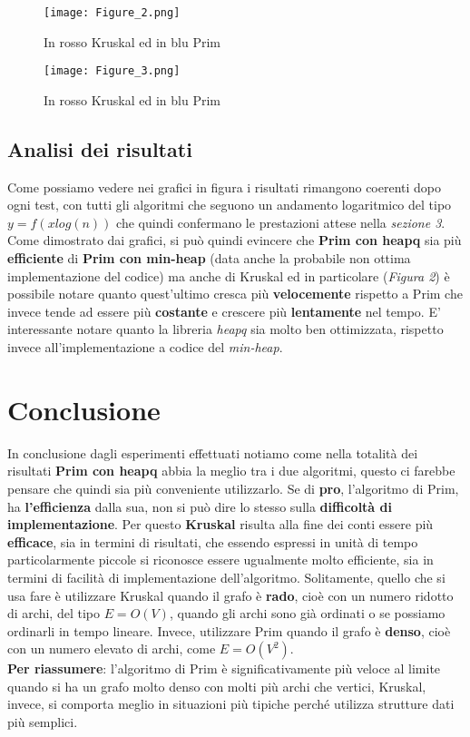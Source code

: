 \documentclass{article}
\begin{document}
\begin{figure}[!hb]
        \centering
        \texttt{[image: Figure\_2.png]}
        \caption{In rosso Kruskal ed in blu Prim}
        \label{fig:KruskalvsPrim}
\end{figure}

\begin{figure}[!hb]
        \centering
        \texttt{[image: Figure\_3.png]}
        \caption{In rosso Kruskal ed in blu Prim}
        \label{fig:KruskalvsPrim}
\end{figure}

\clearpage

\subsection{Analisi dei risultati}
Come possiamo vedere nei grafici in figura i risultati rimangono coerenti dopo ogni test, con tutti gli algoritmi che seguono un andamento logaritmico del tipo $y=f(xlog(n))$ che quindi confermano le prestazioni attese nella \textit{sezione 3}.
Come dimostrato dai grafici, si può quindi evincere che \textbf{Prim con heapq} sia più \textbf{efficiente} di \textbf{Prim con min-heap} (data anche la probabile non ottima implementazione del codice) ma anche di Kruskal ed in particolare (\textit{Figura 2}) è possibile notare quanto quest'ultimo cresca più \textbf{velocemente} rispetto a Prim che invece tende ad essere più \textbf{costante} e crescere più \textbf{lentamente} nel tempo.
E' interessante notare quanto la libreria \textit{heapq} sia molto ben ottimizzata, rispetto invece all'implementazione a codice del \textit{min-heap}.

\section{Conclusione}
In conclusione dagli esperimenti effettuati notiamo come nella totalità dei risultati \textbf{Prim con heapq} abbia la meglio tra i due algoritmi, questo ci farebbe pensare che quindi sia più conveniente utilizzarlo.
Se di \textbf{pro}, l'algoritmo di Prim, ha \textbf{l'efficienza} dalla sua, non si può dire lo stesso sulla \textbf{difficoltà di implementazione}.
Per questo \textbf{Kruskal} risulta alla fine dei conti essere più \textbf{efficace}, sia in termini di risultati, che essendo espressi in unità di tempo particolarmente piccole si riconosce essere ugualmente molto efficiente, sia in termini di facilità di implementazione dell'algoritmo.
Solitamente, quello che si usa fare è utilizzare Kruskal quando il grafo è \textbf{rado}, cioè con un numero ridotto di archi, del tipo $E=O(V)$, quando gli archi sono già ordinati o se possiamo ordinarli in tempo lineare. Invece, utilizzare Prim quando il grafo è \textbf{denso}, cioè con un numero elevato di archi, come $E=O(V^{2})$. \\
\textbf{Per riassumere}: l'algoritmo di Prim è significativamente più veloce al limite quando si ha un grafo molto denso con molti più archi che vertici, Kruskal, invece, si comporta meglio in situazioni più tipiche perché utilizza strutture dati più semplici.
\end{document}
